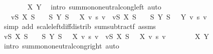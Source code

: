 \begin{isabellebody}
\ \ \ \ \ \ \isamarkupfalse%
\ X\ Y\ \isamarkupfalse%
\ {\isacharparenleft}{\kern0pt}intro\ sum{\isachardot}{\kern0pt}mono{\isacharunderscore}{\kern0pt}neutral{\isacharunderscore}{\kern0pt}cong{\isacharunderscore}{\kern0pt}left{\isacharparenright}{\kern0pt}\ auto\isanewline
\ \ \ \ \isamarkupfalse%
\ \isamarkupfalse%
\ {\isachardoublequoteopen}{\isasymdots}\ {\isacharequal}{\kern0pt}\ {\isacharparenleft}{\kern0pt}{\isasymSum}v{\isasymin}{\isacharbraceleft}{\kern0pt}S{\isachardot}{\kern0pt}\ X\ S\ {\isasymnoteq}\ {}{\isacharbraceright}{\kern0pt}\ {\isasymunion}\ {\isacharbraceleft}{\kern0pt}S{\isachardot}{\kern0pt}\ Y\ S\ {\isasymnoteq}\ {}{\isacharbraceright}{\kern0pt}{\isachardot}{\kern0pt}\ X\ v\ {\isacharasterisk}{\kern0pt}s\ v{\isacharparenright}{\kern0pt}\ {\isacharminus}{\kern0pt}\ {\isacharparenleft}{\kern0pt}{\isasymSum}v{\isasymin}{\isacharbraceleft}{\kern0pt}S{\isachardot}{\kern0pt}\ X\ S\ {\isasymnoteq}\ {}{\isacharbraceright}{\kern0pt}\ {\isasymunion}\ {\isacharbraceleft}{\kern0pt}S{\isachardot}{\kern0pt}\ Y\ S\ {\isasymnoteq}\ {}{\isacharbraceright}{\kern0pt}{\isachardot}{\kern0pt}\ Y\ v\ {\isacharasterisk}{\kern0pt}s\ v{\isacharparenright}{\kern0pt}{\isachardoublequoteclose}\isanewline
\ \ \ \ \ \ \isamarkupfalse%
\ {\isacharparenleft}{\kern0pt}simp\ add{\isacharcolon}{\kern0pt}\ scale{\isacharunderscore}{\kern0pt}left{\isacharunderscore}{\kern0pt}diff{\isacharunderscore}{\kern0pt}distrib\ sum{\isacharunderscore}{\kern0pt}subtractf\ assms{\isacharparenright}{\kern0pt}\isanewline
\ \ \ \ \isamarkupfalse%
\ \isamarkupfalse%
\ {\isachardoublequoteopen}{\isacharparenleft}{\kern0pt}{\isasymSum}v{\isasymin}{\isacharbraceleft}{\kern0pt}S{\isachardot}{\kern0pt}\ X\ S\ {\isasymnoteq}\ {}{\isacharbraceright}{\kern0pt}\ {\isasymunion}\ {\isacharbraceleft}{\kern0pt}S{\isachardot}{\kern0pt}\ Y\ S\ {\isasymnoteq}\ {}{\isacharbraceright}{\kern0pt}{\isachardot}{\kern0pt}\ X\ v\ {\isacharasterisk}{\kern0pt}s\ v{\isacharparenright}{\kern0pt}\ {\isacharequal}{\kern0pt}\ {\isacharparenleft}{\kern0pt}{\isasymSum}v{\isasymin}{\isacharbraceleft}{\kern0pt}S{\isachardot}{\kern0pt}\ X\ S\ {\isasymnoteq}\ {}{\isacharbraceright}{\kern0pt}{\isachardot}{\kern0pt}\ X\ v\ {\isacharasterisk}{\kern0pt}s\ v{\isacharparenright}{\kern0pt}{\isachardoublequoteclose}\isanewline
\ \ \ \ \ \ \isamarkupfalse%
\ X\ Y\ \isamarkupfalse%
\ {\isacharparenleft}{\kern0pt}intro\ sum{\isachardot}{\kern0pt}mono{\isacharunderscore}{\kern0pt}neutral{\isacharunderscore}{\kern0pt}cong{\isacharunderscore}{\kern0pt}right{\isacharparenright}{\kern0pt}\ auto\isanewline

\end{isabellebody}
